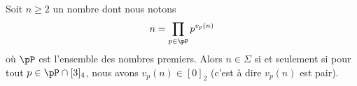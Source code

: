 \begin{theorem}
    Soit \( n\geq 2\) un nombre dont nous notons
    \begin{equation}    \label{EqBMHTzCT}
        n=\prod_{p\in\pP}p^{v_p(n)}
    \end{equation}
    où \( \pP\) est l'ensemble des nombres premiers. Alors \( n\in \Sigma\) si et seulement si pour tout \( p\in\pP\cap[3]_4\), nous avons \( v_p(n)\in [0]_2\) (c'est à dire \( v_p(n)\) est pair).
\end{theorem}

